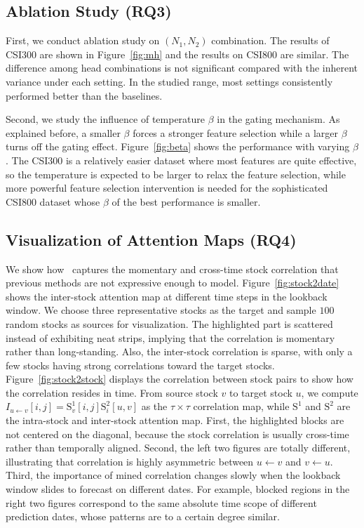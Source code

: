 \subsection{Ablation Study (RQ3)}
First, we conduct ablation study on $(N_1,N_2)$ combination. 
The results of CSI300 are shown in Figure~\ref{fig:mh} and the results on CSI800 are similar. The difference among head combinations is not significant compared with the inherent variance under each setting. In the studied range, most settings consistently performed better than the baselines.

Second, we study the influence of temperature $\beta$ in the gating mechanism.
As explained before, a smaller $\beta$ forces a stronger feature selection while a larger $\beta$ turns off the gating effect.
Figure~\ref{fig:beta} shows the performance with varying $\beta$.
The CSI300 is a relatively easier dataset where most features are quite effective, so the temperature is expected to be larger to relax the feature selection, while more powerful feature selection intervention is needed for the sophisticated CSI800 dataset whose $\beta$ of the best performance is smaller.

\subsection{Visualization of Attention Maps (RQ4)}
We show how \frameworkname~captures the momentary and cross-time stock correlation that previous methods are not expressive enough to model.
Figure~\ref{fig:stock2date} shows the inter-stock attention map at different time steps in the lookback window. We choose three representative stocks as the target and sample $100$ random stocks as sources for visualization.
The highlighted part is scattered instead of exhibiting neat strips, implying that the correlation is momentary rather than long-standing.
Also, the inter-stock correlation is sparse, with only a few stocks having strong correlations toward the target stocks.
Figure~\ref{fig:stock2stock} displays the correlation between stock pairs to show how the correlation resides in time. 
From source stock $v$ to target stock $u$, we compute $I_{u\leftarrow v}[i,j]=\mathrm{S}^1_v[i,j]\mathrm{S}^2_i[u,v]$ as the $\tau\times\tau$ correlation map, while $\mathrm{S}^1$ and $\mathrm{S}^2$ are the intra-stock and inter-stock attention map.
First, the highlighted blocks are not centered on the diagonal, because the stock correlation is usually cross-time rather than temporally aligned. 
Second, the left two figures are totally different, illustrating that correlation is highly asymmetric between $u\leftarrow v$ and $v\leftarrow u$. 
Third, the importance of mined correlation changes slowly when the lookback window slides to forecast on different dates. For example, blocked regions in the right two figures correspond to the same absolute time scope of different prediction dates, whose patterns are to a certain degree similar. 


